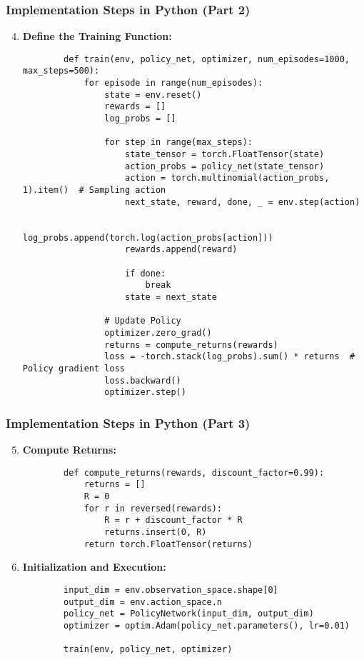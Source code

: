 \documentclass[aspectratio=169]{beamer}
\begin{document}
\begin{frame}[fragile]
    \frametitle{Implementation Steps in Python (Part 2)}
    \begin{enumerate}
        \setcounter{enumi}{3}
        \item \textbf{Define the Training Function:}
        \begin{lstlisting}
        def train(env, policy_net, optimizer, num_episodes=1000, max_steps=500):
            for episode in range(num_episodes):
                state = env.reset()
                rewards = []
                log_probs = []
                
                for step in range(max_steps):
                    state_tensor = torch.FloatTensor(state)
                    action_probs = policy_net(state_tensor)
                    action = torch.multinomial(action_probs, 1).item()  # Sampling action
                    next_state, reward, done, _ = env.step(action)
                    
                    log_probs.append(torch.log(action_probs[action]))
                    rewards.append(reward)
                    
                    if done:
                        break
                    state = next_state

                # Update Policy
                optimizer.zero_grad()
                returns = compute_returns(rewards)
                loss = -torch.stack(log_probs).sum() * returns  # Policy gradient loss
                loss.backward()
                optimizer.step()
        \end{lstlisting}
    \end{enumerate}
\end{frame}

\begin{frame}[fragile]
    \frametitle{Implementation Steps in Python (Part 3)}
    \begin{enumerate}
        \setcounter{enumi}{4}
        \item \textbf{Compute Returns:}
        \begin{lstlisting}
        def compute_returns(rewards, discount_factor=0.99):
            returns = []
            R = 0
            for r in reversed(rewards):
                R = r + discount_factor * R
                returns.insert(0, R)
            return torch.FloatTensor(returns)
        \end{lstlisting}
        
        \item \textbf{Initialization and Execution:}
        \begin{lstlisting}
        input_dim = env.observation_space.shape[0]
        output_dim = env.action_space.n
        policy_net = PolicyNetwork(input_dim, output_dim)
        optimizer = optim.Adam(policy_net.parameters(), lr=0.01)

        train(env, policy_net, optimizer)
        \end{lstlisting}
    \end{enumerate}
\end{frame}
\end{document}
